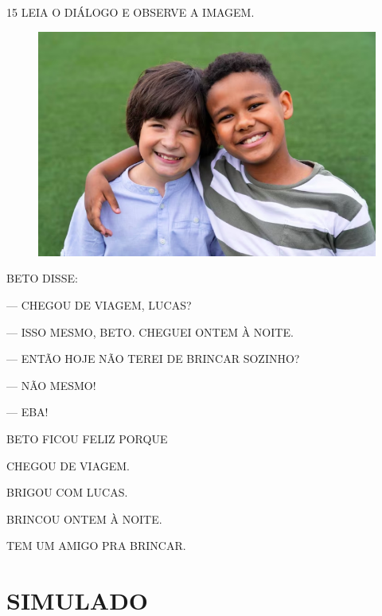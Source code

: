 \num{15} LEIA O DIÁLOGO E OBSERVE A IMAGEM.

\begin{figure}[H]
\centering
\includegraphics[width=\textwidth]{media/image220b.png}
\end{figure}

\begin{myquote}
BETO DISSE:

--- CHEGOU DE VIAGEM, LUCAS?

--- ISSO MESMO, BETO. CHEGUEI ONTEM À NOITE.

--- ENTÃO HOJE NÃO TEREI DE BRINCAR SOZINHO?

--- NÃO MESMO!

--- EBA!
\end{myquote}

BETO FICOU FELIZ PORQUE

\begin{escolha}
\item CHEGOU DE VIAGEM.

\item BRIGOU COM LUCAS.

\item BRINCOU ONTEM À NOITE.

\item TEM UM AMIGO PRA BRINCAR.
\end{escolha}



\chapter[SIMULADO 3]{SIMULADO}

\pagebreak

